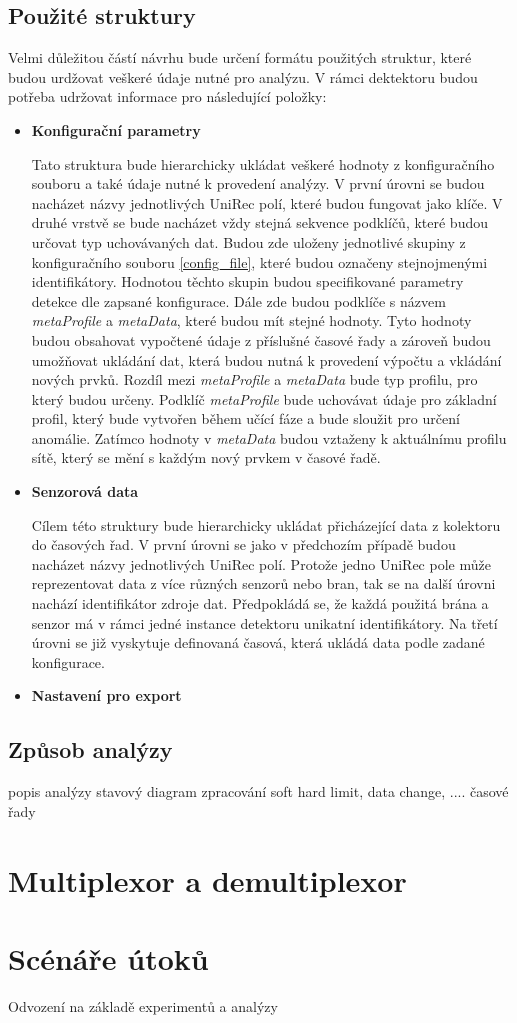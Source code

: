  \subsection{Použité struktury}
 Velmi důležitou částí návrhu bude určení formátu použitých struktur, které budou urdžovat veškeré 
 údaje nutné pro analýzu. V rámci dektektoru budou potřeba udržovat informace pro následující
 položky:
  \begin{itemize}
   \item \textbf{Konfigurační parametry}
   
   Tato struktura bude hierarchicky ukládat veškeré hodnoty z konfiguračního souboru
   a také údaje nutné k provedení analýzy. V první úrovni se budou nacházet názvy jednotlivých 
   UniRec polí, které budou fungovat jako klíče. V druhé vrstvě se bude nacházet vždy stejná 
   sekvence podklíčů, které budou určovat typ uchovávaných dat. Budou zde uloženy jednotlivé 
   skupiny z konfiguračního souboru \ref{config_file}, které budou označeny stejnojmenými
   identifikátory. Hodnotou těchto skupin budou specifikované parametry detekce dle zapsané
   konfigurace. Dále zde budou podklíče s názvem \textit{metaProfile} a \textit{metaData},
   které budou mít
   stejné hodnoty. Tyto hodnoty budou obsahovat vypočtené údaje z příslušné časové řady
   a zároveň budou umožňovat ukládání dat, která budou nutná k provedení výpočtu 
   a vkládání nových prvků. Rozdíl mezi \textit{metaProfile} a \textit{metaData} bude typ profilu,
   pro který budou určeny. Podklíč \textit{metaProfile} bude uchovávat údaje pro základní profil,
   který bude vytvořen během učící fáze a bude sloužit pro určení anomálie. Zatímco 
   hodnoty v \textit{metaData} budou vztaženy k aktuálnímu profilu sítě, který se mění s každým
   nový prvkem v časové řadě.
   
   \item \textbf{Senzorová data}
   
   Cílem této struktury bude hierarchicky ukládat přicházející data z kolektoru do časových řad. 
   V první úrovni se jako v předchozím případě budou nacházet názvy jednotlivých UniRec polí. 
   Protože jedno UniRec pole může reprezentovat data z více různých senzorů nebo bran, tak se na 
   další úrovni nachází identifikátor zdroje dat. Předpokládá se, že každá použitá brána a senzor 
   má v rámci jedné instance detektoru unikatní identifikátory. Na třetí úrovni se již vyskytuje 
   definovaná časová, která ukládá data podle zadané konfigurace.
   
   \item \textbf{Nastavení pro export} 
  \end{itemize}

 
 
 \subsection{Způsob analýzy}
 popis analýzy
  stavový diagram zpracování
  soft hard limit, data change, .... 
  časové řady
  
 \section{Multiplexor a demultiplexor}
 
 \section{Scénáře útoků}
  Odvození na základě experimentů a analýzy